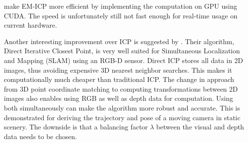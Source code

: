 \citet{tamaki2010softassign} make EM-ICP more efficient by implementing the computation on GPU using CUDA. The speed is unfortunately still not fast enough for real-time usage on current hardware.

Another interesting improvement over ICP is suggested by \citet{tykkala2011direct}. Their algorithm, Direct Iterative Closest Point, is very well suited for Simultaneous Localization and Mapping (SLAM) using an RGB-D sensor. Direct ICP stores all data in 2D images, thus avoiding expensive 3D nearest neighbor searches. This makes it computationally much cheaper than traditional ICP. The change in approach from 3D point coordinate matching to computing transformations between 2D images also enables using RGB as well as depth data for computation. Using both simultaneously can make the algorithm more robust and accurate. This is demonstrated for deriving the trajectory and pose of a moving camera in static scenery. The downside is that a balancing factor $\lambda$ between the visual and depth data needs to be chosen.



